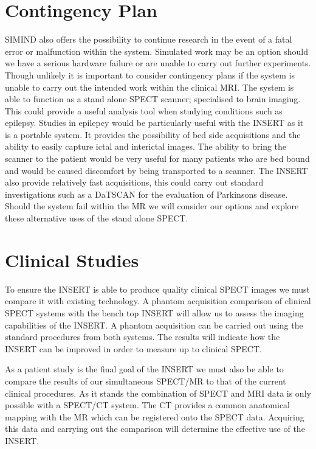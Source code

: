 \section{Contingency Plan}
SIMIND also offers the possibility to continue research in the event of a fatal error or malfunction within the system. Simulated work may be an option should we have a serious hardware failure or are unable to carry out further experiments. Though unlikely it is important to consider contingency plans if the system is unable to carry out the intended work within the clinical \acrshort{MRI}. The system is able to function as a stand alone \acrshort{SPECT} scanner; specialised to brain imaging. This could provide a useful analysis tool when studying conditions such as epilepsy. Studies in epilepcy would be particularly useful with the \acrshort{INSERT} as it is a portable system. It provides the possibility of bed side acquisitions and the ability to easily capture ictal and interictal images. The ability to bring the scanner to the patient would be very useful for many patients who are bed bound and would be caused discomfort by being transported to a scanner. The \acrshort{INSERT} also provide relatively fast acquisitions, this could carry out standard investigations such as a DaTSCAN for the evaluation of Parkinsons disease. Should the system fail within the \acrshort{MR} we will consider our options and explore these alternative uses of the stand alone \acrshort{SPECT}. 

\section{Clinical Studies}
To ensure the \acrshort{INSERT} is able to produce quality clinical \acrshort{SPECT} images we must compare it with existing technology. A phantom acquisition comparison of clinical \acrshort{SPECT} systems with the bench top \acrshort{INSERT} will allow us to assess the imaging capabilities of the INSERT. A phantom acquisition can be carried out using the standard procedures from both systems. The results will indicate how the \acrshort{INSERT} can be improved in order to measure up to clinical \acrshort{SPECT}.

As a patient study is the final goal of the \acrshort{INSERT} we must also be able to compare the results of our simultaneous \acrshort{SPECT/MR} to that of the current clinical procedures. As it stands the combination of \acrshort{SPECT} and \acrshort{MRI} data is only possible with a \acrshort{SPECT/CT} system. The \acrshort{CT} provides a common anatomical mapping with the \acrshort{MR} which can be registered onto the \acrshort{SPECT} data. Acquiring this data and carrying out the comparison will determine the effective use of the \acrshort{INSERT}. 

